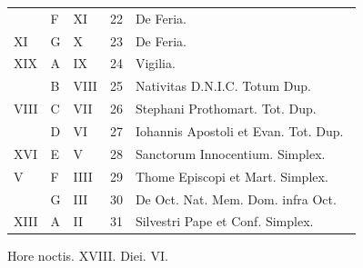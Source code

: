 \begin{center}
\begin{tabular}{l | l | l | r | l l}
\color{Red}  & F & \color{Red} XI & 22 & De Feria. & \color{Red} \\
\color{Red} XI & G & \color{Red} X & 23 & De Feria. & \color{Red} \\
\color{Red} XIX & \color{Red} A & \color{Red} IX & 24 & \qquad \color{Red} Vigilia. \\
\color{Red}  & B & \color{Red} VIII & 25 & \multicolumn{2}{l}{\color{Red} Nativitas D.N.I.C. Totum Dup.} \color{Red} \\
\color{Red} VIII & C & \color{Red} VII & 26 & Stephani Prothomart. Tot. Dup. & \color{Red} \\
\color{Red}  & D & \color{Red} VI & 27 & \multicolumn{2}{l}{\color{Red} Iohannis Apostoli et Evan. Tot. Dup.} \color{Red} \\
\color{Red} XVI & E & \color{Red} V & 28 & Sanctorum Innocentium. Simplex. & \color{Red} \\
\color{Red} V & F & \color{Red} IIII & 29 & \color{Red} Thome Episcopi et Mart. Simplex. & \color{Red} \\
\color{Red}  & G & \color{Red} III & 30 & De Oct. Nat. Mem. Dom. infra Oct. & \color{Red} \\
\color{Red} XIII & \color{Red} A & \color{Red} II & 31 & Silvestri Pape et Conf. Simplex. & \\
\end{tabular}
\newline \color{Red} Hore noctis. XVIII. Diei. VI.
\end{center}
